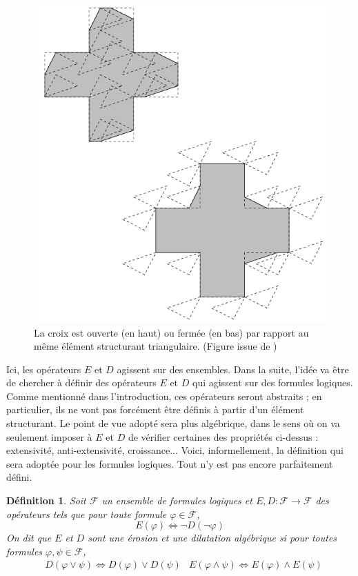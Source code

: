 \documentclass[11pt,a4paper]{report}
\newtheorem{defi}[theo]{Définition}
\newcommand{\ph}{\varphi}
\newcommand{\F}{\mathcal{F}}
\newcommand{\1}{\mathbbm{1}}
\begin{document}
\begin{figure}
\begin{center}
\includegraphics[scale=0.5]{ouvfer.png}
\caption*{La croix est ouverte (en haut) ou fermée (en bas) par rapport au même élément structurant triangulaire. (Figure issue de \cite{Blo07})}
\end{center}
\end{figure}
Ici, les opérateurs $E$ et $D$ agissent sur des ensembles. Dans la suite, l'idée va être de chercher à définir des opérateurs $E$ et $D$ qui agissent sur des formules logiques. Comme mentionné dans l'introduction, ces opérateurs seront abstraits ; en particulier, ils ne vont pas forcément être définis à partir d'un élément structurant. Le point de vue adopté sera plus algébrique, dans le sens où on va seulement imposer à $E$ et $D$ de vérifier certaines des propriétés ci-dessus : extensivité, anti-extensivité, croissance... Voici, informellement, la définition qui sera adoptée pour les formules logiques. Tout n'y est pas encore parfaitement défini.
\begin{defi}
Soit $\F$ un ensemble de formules logiques et $E,D : \F \to \F$ des opérateurs tels que pour toute formule $\ph \in \F$, 
\[ E(\ph) \Leftrightarrow \neg D ( \neg \ph) \]
On dit que $E$ et $D$ sont une érosion et une dilatation algébrique si pour toutes formules $\ph,\psi \in \F$,
\begin{align*}
& D(\ph \vee \psi) \Leftrightarrow D(\ph) \vee D(\psi) & E(\ph \wedge \psi) \Leftrightarrow E(\ph) \wedge E(\psi)
\end{align*}
\end{defi}
\end{document}
